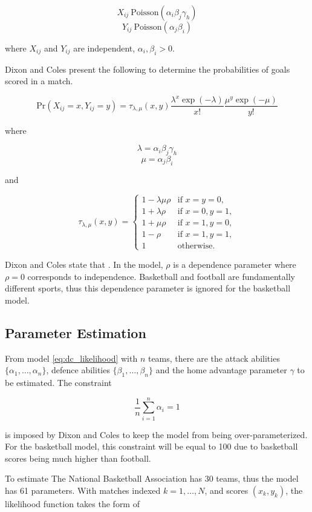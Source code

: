 $$X_{ij} ~ \text{Poisson}(\alpha_i\beta_j\gamma_h)$$
$$Y_{ij} ~ \text{Poisson}(\alpha_j\beta_i)$$

where $X_{ij}$ and $Y_{ij}$ are independent, $\alpha_i, \beta_i > 0.$

Dixon and Coles present the following to determine the probabilities of goals scored in a match.

\begin{equation}
\text{Pr}(X_{ij}=x, Y_{ij} = y) = \tau_{\lambda,\mu}(x, y)\frac{\lambda^x\exp(-\lambda)}{x!}\frac{\mu^y\exp(-\mu)}{y!}
\end{equation}

where

$$\lambda = \alpha_i\beta_j\gamma_h$$
$$\mu = \alpha_j\beta_i$$

and

\[
	\tau_{\lambda,\mu}(x,y) = 
	\begin{cases}
		1 - \lambda \mu \rho & \text{if } x=y=0,\\
		1 + \lambda \rho & \text{if } x=0,y=1,\\
		1 + \mu \rho & \text{if } x=1,y=0,\\
		1 - \rho & \text{if } x=1,y=1,\\
		1 & \text{otherwise}.
	\end{cases}
\]	

Dixon and Coles state that .  In the model, $\rho$ is a dependence parameter where $\rho=0$ corresponds to independence.  Basketball and football are fundamentally different sports, thus this dependence parameter is ignored for the basketball model.  

\subsection{Parameter Estimation}

From model \ref{eq:dc_likelihood} with $n$ teams, there are the attack abilities $\{\alpha_1,\ldots,\alpha_n\}$, defence abilities $\{\beta_1,\ldots,\beta_n\}$ and the home advantage parameter $\gamma$ to be estimated.  The constraint

$$\frac{1}{n}\sum_{i=1}^{n}\alpha_i = 1$$

is imposed by Dixon and Coles to keep the model from being over-parameterized.  For the basketball model, this constraint will be equal to 100 due to basketball scores being much higher than football.  

To estimate The National Basketball Association has 30 teams, thus the model has 61 parameters.  With matches indexed $k=1,\ldots,N$, and scores $(x_k, y_k)$, the likelihood function takes the form of



